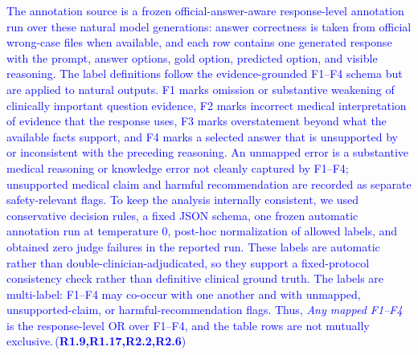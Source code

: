 \documentclass[a4paper,fleqn,doubleblind]{cas-sc}
\DeclareRobustCommand{\added}[1]{\textcolor{blue}{#1}}
\DeclareRobustCommand{\revtag}[1]{\textcolor{blue}{\scriptsize\,(\textbf{#1})}}
\begin{document}
\added{The annotation source is a frozen official-answer-aware response-level annotation run over these natural model generations: answer correctness is taken from official wrong-case files when available, and each row contains one generated response with the prompt, answer options, gold option, predicted option, and visible reasoning. The label definitions follow the evidence-grounded F1--F4 schema but are applied to natural outputs. F1 marks omission or substantive weakening of clinically important question evidence, F2 marks incorrect medical interpretation of evidence that the response uses, F3 marks overstatement beyond what the available facts support, and F4 marks a selected answer that is unsupported by or inconsistent with the preceding reasoning. An unmapped error is a substantive medical reasoning or knowledge error not cleanly captured by F1--F4; unsupported medical claim and harmful recommendation are recorded as separate safety-relevant flags. To keep the analysis internally consistent, we used conservative decision rules, a fixed JSON schema, one frozen automatic annotation run at temperature 0, post-hoc normalization of allowed labels, and obtained zero judge failures in the reported run. These labels are automatic rather than double-clinician-adjudicated, so they support a fixed-protocol consistency check rather than definitive clinical ground truth. The labels are multi-label: F1--F4 may co-occur with one another and with unmapped, unsupported-claim, or harmful-recommendation flags. Thus, \textit{Any mapped F1--F4} is the response-level OR over F1--F4, and the table rows are not mutually exclusive.}\revtag{R1.9,R1.17,R2.2,R2.6}
\end{document}
